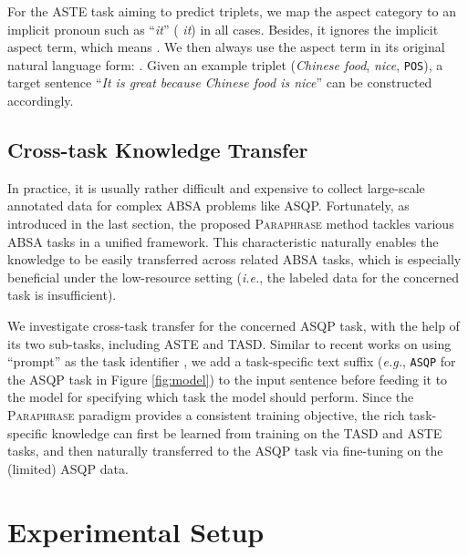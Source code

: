 \documentclass[11pt]{article}
\begin{document}
For the ASTE task aiming to predict  triplets, we map the aspect category to an implicit pronoun such as ``\textit{it}'' ( \textit{it}) in all cases.
Besides, it ignores the implicit aspect term, which means . We then always use the aspect term in its original natural language form: . 
Given an example triplet (\textit{Chinese food}, \textit{nice}, \texttt{POS}), a target sentence ``\textit{It is great because Chinese food is nice}'' can be constructed accordingly.


\subsection{Cross-task Knowledge Transfer}
In practice, it is usually rather difficult and expensive to collect large-scale annotated data for complex ABSA problems like ASQP. Fortunately, as introduced in the last section, the proposed \textsc{Paraphrase} method tackles various ABSA tasks in a unified framework.
This characteristic naturally enables the knowledge to be easily transferred across related ABSA tasks, which is especially beneficial under the low-resource setting (\textit{i.e.}, the labeled data for the concerned task is insufficient).


We investigate cross-task transfer for the concerned ASQP task, with the help of its two sub-tasks, including ASTE and TASD.
Similar to recent works on using ``prompt'' as the task identifier \cite{t5-paper, gpt-understands}, we add a task-specific text suffix (\textit{e.g.}, \verb|ASQP| for the ASQP task in Figure \ref{fig:model}) to the input sentence before feeding it to the model for specifying which task the model should perform.
Since the \textsc{Paraphrase} paradigm provides a consistent training objective, the rich task-specific knowledge can first be learned from training on the TASD and ASTE tasks, and then naturally transferred to the ASQP task via fine-tuning on the (limited) ASQP data.


\section{Experimental Setup}

\begin{table}[!t]
    \centering
    \caption{Data statistics for the ASQP task. \#S, \#+, \#0,  and \#- denote the number of sentences, number of positive, neutral, negative quads respectively.}
    \label{tab:data}
    \vspace{-0.4cm}
\end{table}
\end{document}
